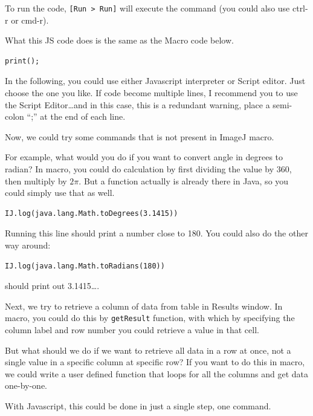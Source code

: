 \documentclass[11pt,a4paper,oneside]{report}
\newcommand{\ijmenu}[1]{\texttt{\small#1}}
\newcommand{\ilcom}[1]{\texttt{\small#1}}
\begin{document}
To run the code, \ijmenu{[Run > Run]} will execute the command (you could also
use ctrl-r or cmd-r). 

What this JS code does is the same as the Macro code below. 
\begin{lstlisting}[numbers=none]
print();
\end{lstlisting}

In the following, you could use either Javascript interpreter 
or Script editor. Just choose the one you like. If code become multiple lines, 
I recommend you to use the Script Editor\ldots and in this case, this is a
redundant warning, place a semi-colon ``;'' at the end of each line.

Now, we could try some commands that is not present in 
ImageJ macro.
 
For example, what would you do if you want to convert angle in degrees to radian? 
In macro, you could do calculation by first dividing the value by 360, 
then multiply by $2\pi$. But a function actually is already there in Java, 
so you could simply use that as well. 
\begin{lstlisting}[numbers=none]
IJ.log(java.lang.Math.toDegrees(3.1415)) 
\end{lstlisting}
Running this line should print a number close to 180. You could also do the
other way around:
 \begin{lstlisting}[numbers=none]
IJ.log(java.lang.Math.toRadians(180)) 
\end{lstlisting}
should print out 3.1415\dots.

Next, we try to retrieve a column of data from table in Results window. 
In macro, you could do this by \ilcom{getResult} function, 
with which by specifying the column label and row number you could retrieve 
a value in that cell. 

But what should we do if we want to retrieve all data in a row at once, 
not a single value in a specific column at specific row? 
If you want to do this in macro, we could write a user defined function that loops 
for all the columns and get data one-by-one. 

With Javascript, this could be done in just a single step, one command. 
\end{document}
